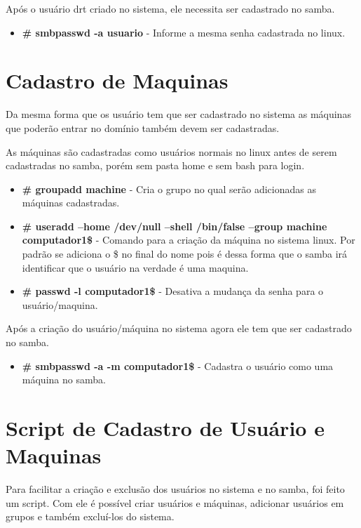 Após o usuário drt criado no sistema, ele necessita ser cadastrado no samba.

\begin{itemize}
	\item \textbf{\# smbpasswd -a usuario} - Informe a mesma senha cadastrada no linux.
\end{itemize}

\section{Cadastro de Maquinas}

Da mesma forma que os usuário tem que ser cadastrado no sistema as máquinas que poderão entrar no domínio também devem ser cadastradas.

As máquinas são cadastradas como usuários normais no linux antes de serem cadastradas no samba, porém sem pasta home e sem bash para login.

\begin{itemize}
	\item \textbf{\# groupadd machine} - Cria o grupo no qual serão adicionadas as máquinas cadastradas.
	\item \textbf{\# useradd --home /dev/null --shell /bin/false --group machine computador1\$} - 	Comando para a criação da máquina no sistema linux. Por padrão se adiciona o \$ no final do nome pois é dessa forma que o samba irá identificar que o usuário na verdade é uma maquina. 
	\item \textbf{\# passwd -l computador1\$} - Desativa a mudança da senha para o usuário/maquina.
\end{itemize}

Após a criação do usuário/máquina no sistema agora ele tem que ser cadastrado no samba.

\begin{itemize}	
	\item \textbf{\# smbpasswd -a -m computador1\$} - Cadastra o usuário como uma máquina no samba.
\end{itemize}


\section{Script de Cadastro de Usuário e Maquinas}

Para facilitar a criação e exclusão dos usuários no sistema e no samba, foi feito um script. Com ele é possível criar usuários e máquinas, adicionar usuários em grupos e também excluí-los do sistema.


